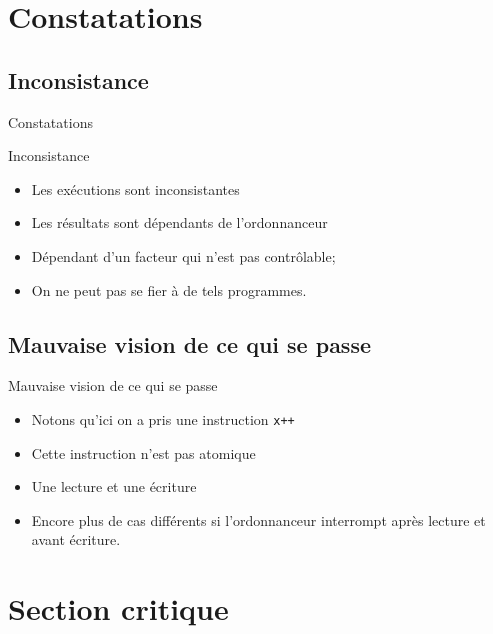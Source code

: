\def\sectitle{Constatations}
\section{\sectitle}
\def\subsectitle{Inconsistance}
\subsection{\subsectitle}
\begin{frame}{\sectitle}
\begin{block}{\subsectitle}
\begin{itemize}
\item Les exécutions sont inconsistantes
\item Les résultats sont dépendants de l'ordonnanceur
\item Dépendant d'un facteur qui n'est pas contrôlable;
\item On ne peut pas se fier à de tels programmes.
\end{itemize}
\end{block}

\def\subsectitle{Mauvaise vision de ce qui se passe}
\subsection{\subsectitle}
\begin{alertblock}{\subsectitle}
\begin{itemize}
    \item Notons qu'ici on a pris une instruction \texttt{x++}
    \item Cette instruction n'est pas atomique
    \item Une lecture et une écriture
    \item Encore plus de cas différents si l'ordonnanceur interrompt après
    lecture et avant écriture.
\end{itemize}
\end{alertblock}

\end{frame}


\def\sectitle{Section critique}
\section{\sectitle}
\def\subsectitle{Définition}
